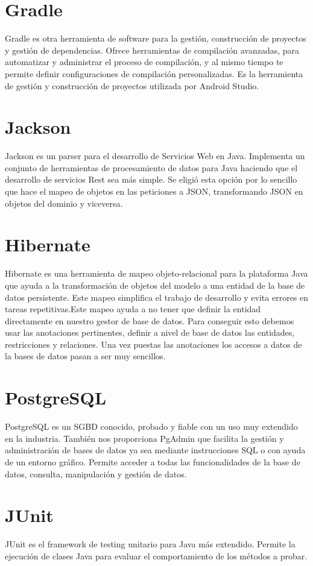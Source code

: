 \section{Gradle}
Gradle es otra herramienta de software para la gestión, construcción de proyectos y gestión de dependencias. Ofrece
  herramientas de compilación avanzadas, para automatizar y administrar el proceso de compilación, y al mismo tiempo te permite definir configuraciones de compilación personalizadas. Es la herramienta de gestión y construcción de proyectos utilizada por Android Studio.



\section{Jackson}

Jackson es un parser para el desarrollo de Servicios Web en Java. Implementa un conjunto de   herramientas de procesamiento de datos para Java haciendo que el desarrollo de servicios Rest sea más simple. Se eligió esta opción por lo sencillo que hace el mapeo de objetos en las peticiones a JSON, transformando  JSON en objetos del dominio y viceversa.








\section{Hibernate}
Hibernate  \cite{4} es una herramienta de mapeo objeto-relacional para la plataforma Java que ayuda a la transformación de objetos del modelo a una entidad de la base de datos persistente. Este mapeo simplifica el trabajo de desarrollo y evita errores en tareas repetitivas.Este mapeo ayuda a  no tener que definir la entidad directamente en nuestro gestor de base de datos. Para conseguir esto debemos usar las anotaciones pertinentes, definir a nivel de base de datos las entidades, restricciones y relaciones. Una vez puestas las anotaciones los accesos a datos de la  bases de datos pasan a ser muy sencillos.





\section{PostgreSQL}
PostgreSQL es un SGBD conocido, probado y fiable con un uso muy extendido en la industria. También nos proporciona PgAdmin que facilita la gestión y administración de bases de datos ya sea mediante instrucciones SQL o con ayuda de un entorno gráfico. Permite acceder a todas las funcionalidades de la base de datos, consulta, manipulación y gestión de datos.
\section{JUnit}
JUnit es el framework de testing unitario para Java más extendido.
Permite la ejecución de clases Java para evaluar el comportamiento de los métodos a probar.


\vspace{1cm}


